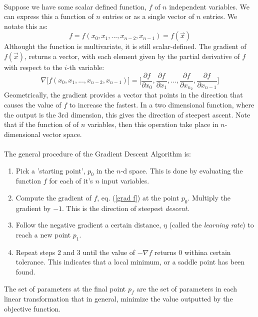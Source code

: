 \documentclass[12pt,letterpaper]{article}
\begin{document}
\paragraph*{}Suppose we have some scalar defined function, $f$ of $n$ independent variables. We can express this a function of $n$ entries or as a single vector of $n$ entries. We notate this as:
\begin{equation}
\label{f}
f = f(x_0,x_1,...,x_{n-2},x_{n-1}) = f(\vec{x})
\end{equation}
Althought the function is multivariate, it is still scalar-defined. The gradient of $f(\vec{x})$, returns a vector, with each element given by the partial derivative of $f$ with respect to the $i$-th variable:
\begin{equation}
\label{grad f}
\nabla \big[ f(x_0,x_1,...,x_{n-2},x_{n-1}) \big] =
\Big[ \frac{\partial f}{\partial x_0} , \frac{\partial f}{\partial x_1} , ... ,
\frac{\partial f}{\partial x_{n_2}} , \frac{\partial f}{\partial x_{n-1}} \Big]
\end{equation}
Geometrically, the gradient provides a vector that points in the direction that causes the value of $f$ to increase the fastest. In a two dimensional function, where the output is the 3rd dimension, this gives the direction of steepest ascent. Note that if the function of of $n$ variables, then this operation take place in $n$-dimensional vector space.
\paragraph*{}The general procedure of the Gradient Descent Algorithm is:
\begin{enumerate}
\item Pick a 'starting point', $p_0$ in the $n$-d space. This is done by  evaluating the function $f$ for each of it's $n$ input variables.
\item Compute the gradient of $f$, eq. (\ref{grad f}) at the point $p_0$. Multiply the gradient by $-1$. This is the direction of steepest \textit{descent}. 
\item Follow the negative gradient a certain distance, $\eta$ (called the \textit{learning rate}\cite{Geron}) to reach a new point $p_1$. 
\item Repeat steps 2 and 3 until the value of $-\nabla f$ returns 0 withina  certain tolerance. This indicates that a local minimum, or a saddle point has been found.
\end{enumerate}
The set of parameters at the final point $p_f$ are the set of parameters in each linear transformation that in general, minimize the value outputted by the objective function. 
\end{document}
